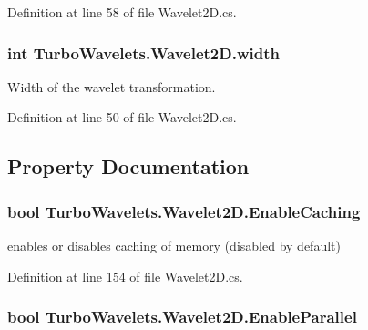 \-Definition at line 58 of file \-Wavelet2\-D.\-cs.

\hypertarget{class_turbo_wavelets_1_1_wavelet2_d_aaa4b3711957fe1798980e6891331a08d}{
\subsubsection[{width}]{\setlength{\rightskip}{0pt plus 5cm}int {\bf \-Turbo\-Wavelets.\-Wavelet2\-D.\-width}}}\label{class_turbo_wavelets_1_1_wavelet2_d_aaa4b3711957fe1798980e6891331a08d}


\-Width of the wavelet transformation. 



\-Definition at line 50 of file \-Wavelet2\-D.\-cs.



\subsection{\-Property \-Documentation}
\hypertarget{class_turbo_wavelets_1_1_wavelet2_d_abbd41e51d24f8a7912ae47dd364ed4fb}{
\subsubsection[{\-Enable\-Caching}]{\setlength{\rightskip}{0pt plus 5cm}bool {\bf \-Turbo\-Wavelets.\-Wavelet2\-D.\-Enable\-Caching}}}\label{class_turbo_wavelets_1_1_wavelet2_d_abbd41e51d24f8a7912ae47dd364ed4fb}


enables or disables caching of memory (disabled by default) 



\-Definition at line 154 of file \-Wavelet2\-D.\-cs.

\hypertarget{class_turbo_wavelets_1_1_wavelet2_d_abec21e54c6ab8cce0e02ef3ad64ae5af}{
\subsubsection[{\-Enable\-Parallel}]{\setlength{\rightskip}{0pt plus 5cm}bool {\bf \-Turbo\-Wavelets.\-Wavelet2\-D.\-Enable\-Parallel}}}\label{class_turbo_wavelets_1_1_wavelet2_d_abec21e54c6ab8cce0e02ef3ad64ae5af}


